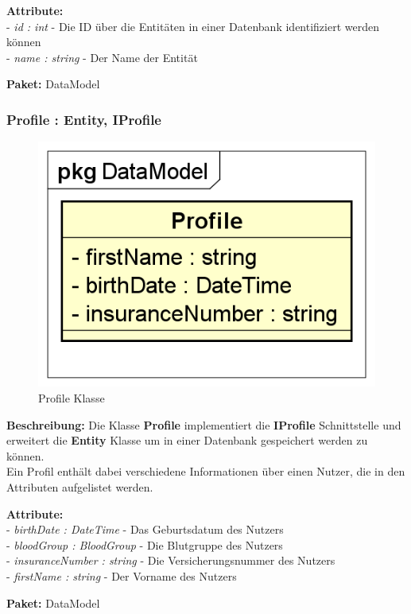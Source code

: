 \documentclass[a4paper]{scrreprt}
\begin{document}
\textbf{Attribute:}\\
- \textit{id : int} - Die ID über die Entitäten in einer Datenbank identifiziert werden können\\
- \textit{name : string} - Der Name der Entität

\textbf{Paket:} DataModel

\subsubsection{Profile : Entity, IProfile}
\begin{figure}[H]
\centering
\includegraphics[width=0.75\textheight]{graphics/Klassendiagramme/Model/Profile.png}
\caption{Profile Klasse}
\end{figure}
\textbf{Beschreibung:} Die Klasse \textbf{Profile} implementiert die \textbf{IProfile} Schnittstelle und erweitert die \textbf{Entity} Klasse um in einer Datenbank gespeichert werden zu können.\\
Ein Profil enthält dabei verschiedene Informationen über einen Nutzer, die in den Attributen aufgelistet werden.

\textbf{Attribute:}\\
- \textit{birthDate : DateTime} - Das Geburtsdatum des Nutzers\\
- \textit{bloodGroup : BloodGroup} - Die Blutgruppe des Nutzers\\
- \textit{insuranceNumber : string} - Die Versicherungsnummer des Nutzers\\
- \textit{firstName : string} - Der Vorname des Nutzers

\textbf{Paket:} DataModel
\end{document}
